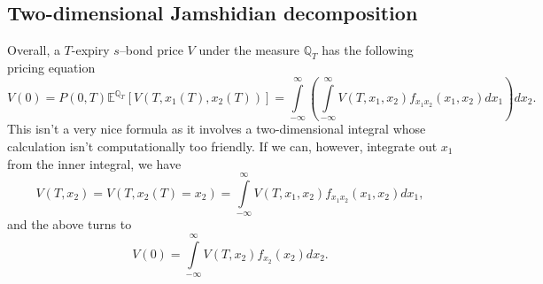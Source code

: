 \documentclass[11pt,a4paper]{article}
\numberwithin{equation}{section}
\begin{document}
\subsection{Two-dimensional Jamshidian decomposition}
Overall, a $T$-expiry $s$--bond price $V$ under the measure $\mathbb{Q}_T$ has the following pricing equation 
\begin{equation*}
  V(0) = P(0,T){\mathbb{E}^{{\mathbb{Q}_T}}}\left[ {V(T,{x_1}(T),{x_2}(T))} \right] = \int\limits_{ - \infty }^\infty  {\left( {\int\limits_{ - \infty }^\infty  {V(T,{x_1},{x_2}){f_{{x_1}{x_2}}}({x_1},{x_2})d{x_1}} } \right)d{x_2}}.
\end{equation*}
This isn't a very nice formula as it involves a two-dimensional integral whose calculation isn't computationally too friendly. 
If we can, however, integrate out $x_1$ from the inner integral, we have 
\begin{equation*}
  V(T,{x_2}) = V(T,{x_2}(T) = {x_2}) = \int\limits_{ - \infty }^\infty  {V(T,{x_1},{x_2}){f_{{x_1}{x_2}}}({x_1},{x_2})d{x_1}},
\end{equation*}
and the above turns to 
\begin{equation*}
  V(0) = \int\limits_{ - \infty }^\infty  {V(T,{x_2}){f_{{x_2}}}({x_2})d{x_2}}.
\end{equation*}







\newpage
\end{document}
